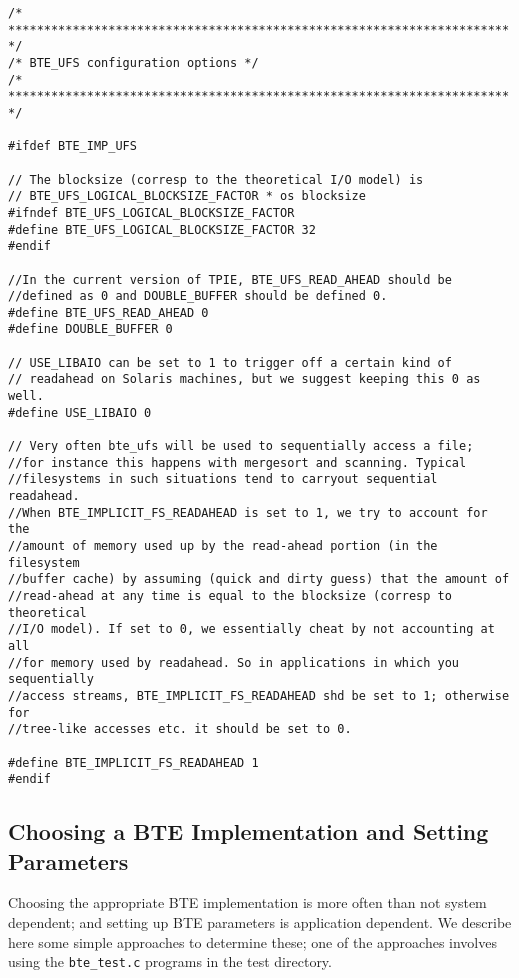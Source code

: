 \begin{verbatim}
/* ********************************************************************** */
/* BTE_UFS configuration options */
/* ********************************************************************** */

#ifdef BTE_IMP_UFS

// The blocksize (corresp to the theoretical I/O model) is 
// BTE_UFS_LOGICAL_BLOCKSIZE_FACTOR * os blocksize 
#ifndef BTE_UFS_LOGICAL_BLOCKSIZE_FACTOR
#define BTE_UFS_LOGICAL_BLOCKSIZE_FACTOR 32
#endif

//In the current version of TPIE, BTE_UFS_READ_AHEAD should be
//defined as 0 and DOUBLE_BUFFER should be defined 0. 
#define BTE_UFS_READ_AHEAD 0
#define DOUBLE_BUFFER 0

// USE_LIBAIO can be set to 1 to trigger off a certain kind of 
// readahead on Solaris machines, but we suggest keeping this 0 as well.
#define USE_LIBAIO 0

// Very often bte_ufs will be used to sequentially access a file;
//for instance this happens with mergesort and scanning. Typical
//filesystems in such situations tend to carryout sequential readahead.
//When BTE_IMPLICIT_FS_READAHEAD is set to 1, we try to account for the
//amount of memory used up by the read-ahead portion (in the filesystem
//buffer cache) by assuming (quick and dirty guess) that the amount of
//read-ahead at any time is equal to the blocksize (corresp to theoretical
//I/O model). If set to 0, we essentially cheat by not accounting at all
//for memory used by readahead. So in applications in which you sequentially
//access streams, BTE_IMPLICIT_FS_READAHEAD shd be set to 1; otherwise for
//tree-like accesses etc. it should be set to 0.

#define BTE_IMPLICIT_FS_READAHEAD 1
#endif
\end{verbatim}


\subsection{Choosing a BTE Implementation and Setting Parameters}

Choosing the appropriate BTE implementation is more often than
not system dependent; and setting up BTE parameters is 
application dependent. We describe here some simple approaches
to determine these; one of the approaches involves using the
\verb|bte_test.c| programs in the test directory.


